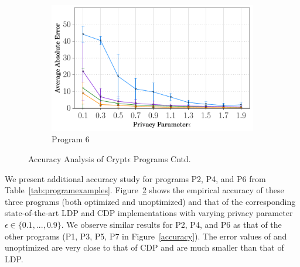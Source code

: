 \begin{figure}
\begin{subfigure}[b]{0.25\linewidth}
    \centering    \includegraphics[width=1\linewidth]{6_finals.pdf}
        \caption{Program 6}
        \label{fig:P6}\end{subfigure}
   \caption{Accuracy Analysis of Crypt$\epsilon$ Programs Cntd.}
   \label{accuracy-appendix}
\end{figure}

We present additional accuracy study for \system programs P2, P4, and P6 from Table~\ref{tab:programexamples}. Figure~\ref{accuracy-appendix} shows the empirical accuracy of these three programs (both optimized and unoptimized) and that of the corresponding state-of-the-art \textsf{LDP} \cite{LDP1} and \textsf{CDP} \cite{Dork} implementations  with varying privacy parameter $\epsilon \in \{0.1,...,0.9\}$. We observe similar results for P2, P4, and P6 as that of the other programs (P1, P3, P5, P7 in Figure~\ref{accuracy}). The error values of \system  and unoptimized \system  are very close to that of \textsf{CDP} and are much smaller than that of \textsf{LDP}.
